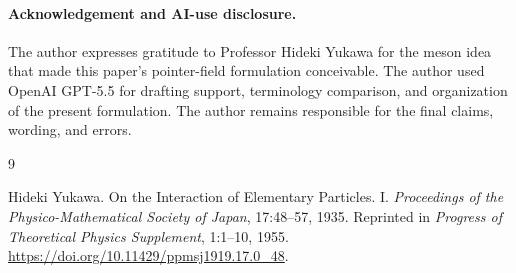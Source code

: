\documentclass[11pt]{article}
\theoremstyle{definition}
\theoremstyle{plain}
\begin{document}
\paragraph{Acknowledgement and AI-use disclosure.}
The author expresses gratitude to Professor Hideki Yukawa for the meson
idea that made this paper's pointer-field formulation conceivable.  The
author used OpenAI GPT-5.5 for drafting support, terminology comparison,
and organization of the present formulation.  The author remains
responsible for the final claims, wording, and errors.

\begin{thebibliography}{9}

Hideki Yukawa.
\newblock On the Interaction of Elementary Particles. I.
\newblock \emph{Proceedings of the Physico-Mathematical Society of Japan},
17:48--57, 1935.
\newblock Reprinted in \emph{Progress of Theoretical Physics Supplement},
1:1--10, 1955.
\newblock \url{https://doi.org/10.11429/ppmsj1919.17.0_48}.

\end{thebibliography}
\end{document}
